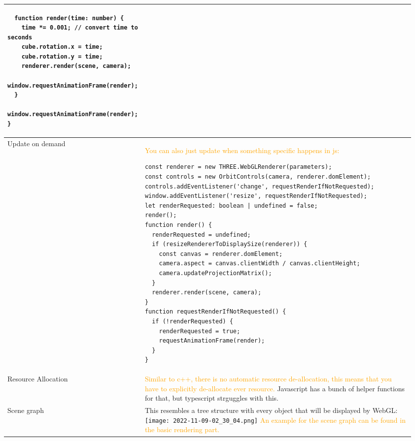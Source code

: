 \documentclass[main.tex,fontsize=8pt,paper=a4,paper=portrait,DIV=calc,]{scrartcl}
\begin{document}
\begin{table}[ht!]
\begin{tabular}{|m{0.2\linewidth}|m{0.755\linewidth}|}
\begin{lstlisting}
  function render(time: number) {
    time *= 0.001; // convert time to seconds
    cube.rotation.x = time;
    cube.rotation.y = time;
    renderer.render(scene, camera);
    window.requestAnimationFrame(render);
  }
  window.requestAnimationFrame(render);
}
\end{lstlisting}\\
\hline
Update on demand & 
\textcolor{orange}{You can also just update when something specific happens in js:}\newline
\begin{lstlisting}
const renderer = new THREE.WebGLRenderer(parameters);
const controls = new OrbitControls(camera, renderer.domElement);
controls.addEventListener('change', requestRenderIfNotRequested);
window.addEventListener('resize', requestRenderIfNotRequested);
let renderRequested: boolean | undefined = false;
render();
function render() {
  renderRequested = undefined;
  if (resizeRendererToDisplaySize(renderer)) {
    const canvas = renderer.domElement;
    camera.aspect = canvas.clientWidth / canvas.clientHeight;
    camera.updateProjectionMatrix();
  }
  renderer.render(scene, camera);
}
function requestRenderIfNotRequested() {
  if (!renderRequested) {
    renderRequested = true;
    requestAnimationFrame(render);
  }
}
\end{lstlisting}\\
\hline
Resource Allocation & 
\textcolor{orange}{Similar to c++, there is no automatic resource de-allocation, this means that you have to explicitly de-allocate ever resource.}\newline 
Javascript has a bunch of helper functions for that, but typescript strguggles with this.\\
\hline
Scene graph & 
This resembles a tree structure with every object that will be displayed by WebGL:\newline
\texttt{[image: 2022-11-09-02\_30\_04.png]}\newline
\textcolor{orange}{An example for the scene graph can be found in the basic rendering part.}\\
\hline
\end{tabular}
\end{table}
\pagebreak
\end{document}
